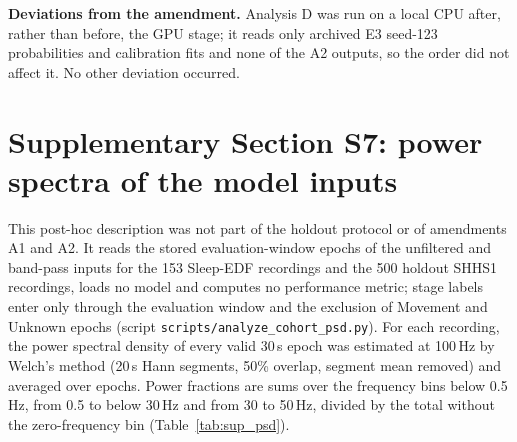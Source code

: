 \documentclass[10pt,a4paper]{article}
\begin{document}
\begin{table}[H]
\centering\small
\caption{E: decomposition of ten-fold training time (seed 123, Tesla V100). Steps: optimiser steps
summed over all stages and folds. Step time: the steps multiplied by the measured mean time per step.
Remainder: wall-clock time not accounted for by step time. Ratios are E0 divided by the configuration.}
\label{tab:sup_a2_cost}
\end{table}

\textbf{Deviations from the amendment.} Analysis D was run on a local CPU after, rather than before, the
GPU stage; it reads only archived E3 seed-123 probabilities and calibration fits and none of the A2
outputs, so the order did not affect it. No other deviation occurred.

\section*{Supplementary Section S7: power spectra of the model inputs}
\label{sec:sup_psd}

This post-hoc description was not part of the holdout protocol or of amendments A1 and A2. It reads the
stored evaluation-window epochs of the unfiltered and band-pass inputs for the 153 Sleep-EDF recordings
and the 500 holdout SHHS1 recordings, loads no model and computes no performance metric; stage labels
enter only through the evaluation window and the exclusion of Movement and Unknown epochs (script
\nolinkurl{scripts/analyze_cohort_psd.py}). For each recording, the power spectral density of every
valid 30\,s epoch was estimated at 100\,Hz by Welch's method (20\,s Hann segments, 50\% overlap, segment
mean removed) and averaged over epochs. Power fractions are sums over the frequency bins below 0.5\,Hz,
from 0.5 to below 30\,Hz and from 30 to 50\,Hz, divided by the total without the zero-frequency bin
(Table~\ref{tab:sup_psd}).
\end{document}
